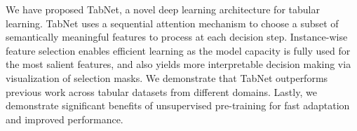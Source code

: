 We have proposed TabNet, a novel deep learning architecture for tabular learning. TabNet uses a sequential attention mechanism to choose a subset of semantically meaningful features to process at each decision step. Instance-wise feature selection enables efficient learning as the model capacity is fully used for the most salient features, and also yields more interpretable decision making via visualization of selection masks. We demonstrate that TabNet outperforms previous work across tabular datasets from different domains. Lastly, we demonstrate significant benefits of unsupervised pre-training for fast adaptation and improved performance.


